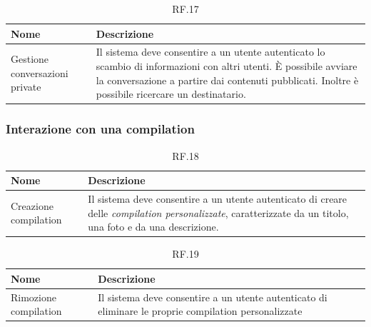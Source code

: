 \documentclass{natourDoc}
\begin{document}
\begin{table}[H]
	\centering
	\begin{tabular}{ |p{5cm}|p{10.3cm}| }
		\hline
		\rowcolor{PineGreen!70}
		\textbf{Nome}                  & \textbf{Descrizione}                                                                           \\
		\hline
		Gestione conversazioni private & Il sistema deve consentire a un utente autenticato lo scambio di informazioni con altri utenti.
		È possibile avviare la conversazione a partire dai contenuti pubblicati. Inoltre è possibile ricercare un destinatario.         \\
		\hline
	\end{tabular}
	\caption{RF.17}

\end{table}

\subsubsection{Interazione con una compilation}
\begin{table}[H]
	\centering
	\begin{tabular}{ |p{5cm}|p{10.3cm}| }
		\hline
		\rowcolor{PineGreen!70}
		\textbf{Nome}         & \textbf{Descrizione}                                                                                    \\
		\hline
		Creazione compilation & Il sistema deve consentire a un utente autenticato di creare delle \textit{compilation personalizzate},
		caratterizzate da un titolo, una foto e da una descrizione.                                                                     \\
		\hline
	\end{tabular}
	\caption{RF.18}

\end{table}

\begin{table}[H]
	\centering
	\begin{tabular}{ |p{5cm}|p{10.3cm}| }
		\hline
		\rowcolor{PineGreen!70}
		\textbf{Nome}         & \textbf{Descrizione}                                                       \\
		\hline
		Rimozione compilation & Il sistema deve consentire a un utente autenticato di eliminare le proprie
		compilation personalizzate                                                                         \\
		\hline
	\end{tabular}
	\caption{RF.19}

\end{table}
\end{document}
